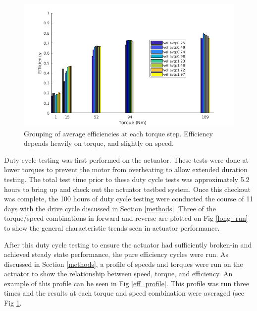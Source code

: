 
\begin{figure}[t]
   \centering
   \includegraphics[width=\linewidth]{images/eff_test_bar_plot_v2}
   \caption{Grouping of average efficiencies at each torque step.
   Efficiency depends heavily on torque, and slightly on speed.}
   \label{eff_results}
\end{figure}

Duty cycle testing was first performed on the actuator.
These tests were done at lower torques to prevent the motor from overheating to allow extended duration testing.
The total test time prior to these duty cycle tests was approximately 5.2 hours to bring up and check out the actuator testbed system.
Once this checkout was complete, the 100 hours of duty cycle testing were conducted the course of 11 days with the drive cycle discussed in Section \ref{methods}.
Three of the torque/speed combinations in forward and reverse are plotted on Fig \ref{long_run} to show the general characteristic trends seen in actuator performance.

After this duty cycle testing to ensure the actuator had sufficiently broken-in and achieved steady state performance, the pure efficiency cycles were run.
As discussed in Section \ref{methods}, a profile of speeds and torques were run on the actuator to show the relationship between speed, torque, and efficiency.
An example of this profile can be seen in Fig \ref{eff_profile}.
This profile was run three times and the results at each torque and speed combination were averaged (see Fig \ref{eff_results}.
